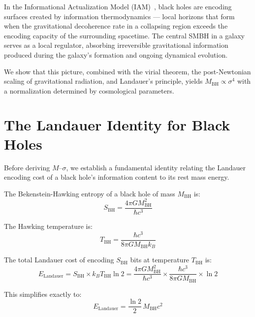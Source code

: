 \documentclass[12pt,a4paper]{article}
\begin{document}
In the Informational Actualization Model (IAM)~\citep{Mahaffey2026a,Mahaffey2026b},
black holes are encoding surfaces created by information thermodynamics --- local
horizons that form when the gravitational decoherence rate in a collapsing region
exceeds the encoding capacity of the surrounding spacetime. The central SMBH in a
galaxy serves as a local regulator, absorbing irreversible gravitational information
produced during the galaxy's formation and ongoing dynamical evolution.

We show that this picture, combined with the virial theorem, the post-Newtonian
scaling of gravitational radiation, and Landauer's principle, yields $M_\mathrm{BH}
\propto \sigma^4$ with a normalization determined by cosmological parameters.

\section{The Landauer Identity for Black Holes}

Before deriving $M$--$\sigma$, we establish a fundamental identity relating the
Landauer encoding cost of a black hole's information content to its rest mass energy.

The Bekenstein-Hawking entropy of a black hole of mass $M_\mathrm{BH}$ is:
\begin{equation}
S_\mathrm{BH} = \frac{4\pi G M_\mathrm{BH}^2}{\hbar c^3}
\end{equation}

The Hawking temperature is:
\begin{equation}
T_\mathrm{BH} = \frac{\hbar c^3}{8\pi G M_\mathrm{BH} k_B}
\end{equation}

The total Landauer cost of encoding $S_\mathrm{BH}$ bits at temperature $T_\mathrm{BH}$ is:
\begin{equation}
E_\mathrm{Landauer} = S_\mathrm{BH} \times k_B T_\mathrm{BH} \ln 2
= \frac{4\pi G M_\mathrm{BH}^2}{\hbar c^3} \times \frac{\hbar c^3}{8\pi G M_\mathrm{BH}} \times \ln 2
\end{equation}

This simplifies exactly to:
\begin{equation}
\boxed{E_\mathrm{Landauer} = \frac{\ln 2}{2}\, M_\mathrm{BH} c^2}
\label{eq:landauer_identity}
\end{equation}
\end{document}
